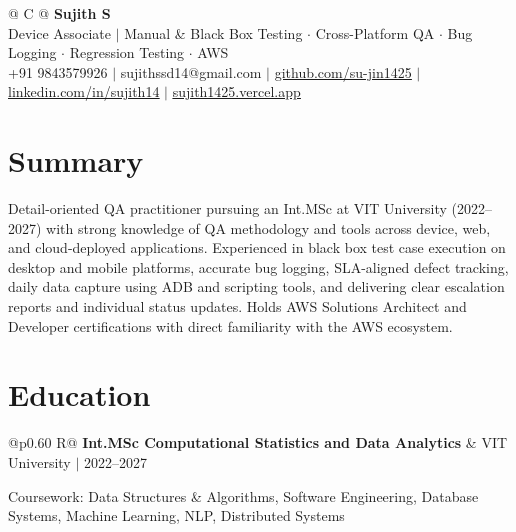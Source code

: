 \documentclass[a4paper,10pt]{article}
\newcommand{\ulink}[2]{\href{#1}{\uline{#2}}}
\newcommand{\subheading}[1]{{\color[HTML]{0A0A0A}\fontsize{12}{14}\selectfont\bfseries #1}}
\newcommand{\meta}[1]{{\color[HTML]{5C5C5C}\fontsize{10.5}{12.5}\selectfont #1}}
\begin{document}
\pagestyle{empty}

\begin{tabularx}{\linewidth}{@{} C @{}}
{\color[HTML]{000000}\fontsize{30}{35}\selectfont\bfseries Sujith S} \\[5pt]
{\fontsize{10.5}{12.5}\selectfont\color[HTML]{3A3A3A}
Device Associate $|$ Manual \& Black Box Testing $\cdot$ Cross-Platform QA $\cdot$ Bug Logging $\cdot$ Regression Testing $\cdot$ AWS} \\[6pt]
{\fontsize{10.5}{12.5}\selectfont\textcolor[HTML]{3A3A3A}{
+91 9843579926 $|$
sujithssd14@gmail.com $|$
\ulink{https://github.com/su-jin1425}{github.com/su-jin1425} $|$
\ulink{https://linkedin.com/in/sujith14}{linkedin.com/in/sujith14} $|$
\ulink{https://sujith1425.vercel.app}{sujith1425.vercel.app}}}
\end{tabularx}

\vspace{2pt}

\section{Summary}
\vspace{3pt}
{\color[HTML]{0A0A0A}\fontsize{11}{14}\selectfont
Detail-oriented QA practitioner pursuing an Int.MSc at VIT University (2022--2027) with strong knowledge of QA methodology and tools across device, web, and cloud-deployed applications. Experienced in black box test case execution on desktop and mobile platforms, accurate bug logging, SLA-aligned defect tracking, daily data capture using ADB and scripting tools, and delivering clear escalation reports and individual status updates. Holds AWS Solutions Architect and Developer certifications with direct familiarity with the AWS ecosystem.}

\vspace{2pt}

\section{Education}
\vspace{2pt}

\begin{tabularx}{\linewidth}{@{}p{0.60\linewidth} R@{}}
\subheading{Int.MSc Computational Statistics and Data Analytics} & \meta{VIT University $|$ 2022--2027}
\end{tabularx}
\vspace{1pt}
{\color[HTML]{3A3A3A}\fontsize{11}{14}\selectfont Coursework: Data Structures \& Algorithms, Software Engineering, Database Systems, Machine Learning, NLP, Distributed Systems}
\end{document}
